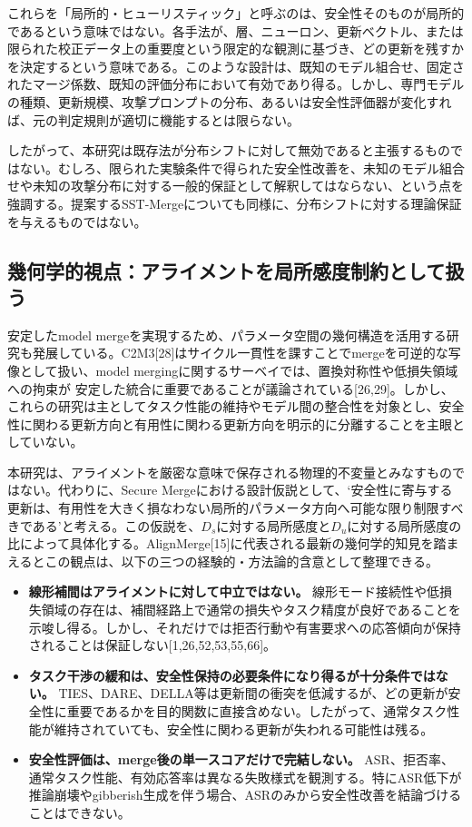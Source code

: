 \documentclass{article}
\begin{document}
これらを「局所的・ヒューリスティック」と呼ぶのは、安全性そのものが局所的であるという意味ではない。各手法が、層、ニューロン、更新ベクトル、または限られた校正データ上の重要度という限定的な観測に基づき、どの更新を残すかを決定するという意味である。このような設計は、既知のモデル組合せ、固定されたマージ係数、既知の評価分布において有効であり得る。しかし、専門モデルの種類、更新規模、攻撃プロンプトの分布、あるいは安全性評価器が変化すれば、元の判定規則が適切に機能するとは限らない。

したがって、本研究は既存法が分布シフトに対して無効であると主張するものではない。むしろ、限られた実験条件で得られた安全性改善を、未知のモデル組合せや未知の攻撃分布に対する一般的保証として解釈してはならない、という点を強調する。提案するSST-Mergeについても同様に、分布シフトに対する理論保証を与えるものではない。

\subsection{幾何学的視点：アライメントを局所感度制約として扱う}
\label{app:geometry}

安定したmodel mergeを実現するため、パラメータ空間の幾何構造を活用する研究も発展している。C2M3[28]はサイクル一貫性を課すことでmergeを可逆的な写像として扱い、model mergingに関するサーベイでは、置換対称性や低損失領域への拘束が
安定した統合に重要であることが議論されている[26,29]。しかし、これらの研究は主としてタスク性能の維持やモデル間の整合性を対象とし、安全性に関わる更新方向と有用性に関わる更新方向を明示的に分離することを主眼としていない。

本研究は、アライメントを厳密な意味で保存される物理的不変量とみなすものではない。代わりに、Secure Mergeにおける設計仮説として、`安全性に寄与する更新は、有用性を大きく損なわない局所的パラメータ方向へ可能な限り制限すべきである'と考える。この仮説を、\(D_s\)に対する局所感度と\(D_u\)に対する局所感度の比によって具体化する。AlignMerge[15]に代表される最新の幾何学的知見を踏まえるとこの観点は、以下の三つの経験的・方法論的含意として整理できる。
\begin{itemize}
\item \textbf{線形補間はアライメントに対して中立ではない。}
  線形モード接続性や低損失領域の存在は、補間経路上で通常の損失やタスク精度が良好であることを示唆し得る。しかし、それだけでは拒否行動や有害要求への応答傾向が保持されることは保証しない[1,26,52,53,55,66]。
\item \textbf{タスク干渉の緩和は、安全性保持の必要条件になり得るが十分条件ではない。}
  TIES、DARE、DELLA等は更新間の衝突を低減するが、どの更新が安全性に重要であるかを目的関数に直接含めない。したがって、通常タスク性能が維持されていても、安全性に関わる更新が失われる可能性は残る。
\item \textbf{安全性評価は、merge後の単一スコアだけで完結しない。}
  ASR、拒否率、通常タスク性能、有効応答率は異なる失敗様式を観測する。特にASR低下が推論崩壊やgibberish生成を伴う場合、ASRのみから安全性改善を結論づけることはできない。
\end{itemize}
\end{document}
